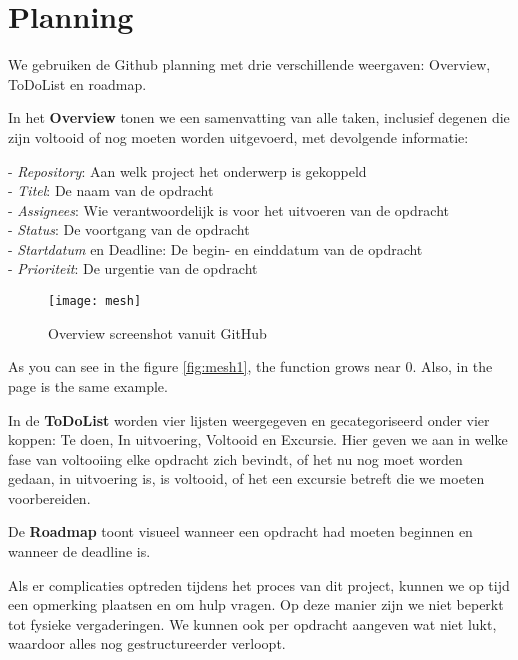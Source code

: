 \section{Planning} \label{planning}
We gebruiken de Github planning met drie verschillende weergaven: Overview, ToDoList en roadmap.

In het \textbf{Overview} tonen we een samenvatting van alle taken, inclusief degenen die zijn voltooid of nog moeten worden uitgevoerd, met devolgende informatie:

- \textit{Repository}: Aan welk project het onderwerp is gekoppeld\\
- \textit{Titel}: De naam van de opdracht\\
- \textit{Assignees}: Wie verantwoordelijk is voor het uitvoeren van de opdracht\\
- \textit{Status}: De voortgang van de opdracht\\
- \textit{Startdatum} en Deadline: De begin- en einddatum van de opdracht\\
- \textit{Prioriteit}: De urgentie van de opdracht\\

\begin{figure}[h]
    \centering
    \texttt{[image: mesh]}
    \caption{Overview screenshot vanuit GitHub}
    \label{fig:overview}
\end{figure}

As you can see in the figure \ref{fig:mesh1}, the 
function grows near 0. Also, in the page \pageref{fig:mesh1} 
is the same example.

In de \textbf{ToDoList} worden vier lijsten weergegeven en gecategoriseerd onder vier koppen: Te doen, In uitvoering, Voltooid en Excursie. Hier geven we aan in welke fase van voltooiing elke opdracht zich bevindt, of het nu nog moet worden gedaan, in uitvoering is, is voltooid, of het een excursie betreft die we moeten voorbereiden.

De \textbf{Roadmap} toont visueel wanneer een opdracht had moeten beginnen en wanneer de deadline is.

Als er complicaties optreden tijdens het proces van dit project, kunnen we op tijd een opmerking plaatsen en om hulp vragen. Op deze manier zijn we niet beperkt tot fysieke vergaderingen. We kunnen ook per opdracht aangeven wat niet lukt, waardoor alles nog gestructureerder verloopt.





